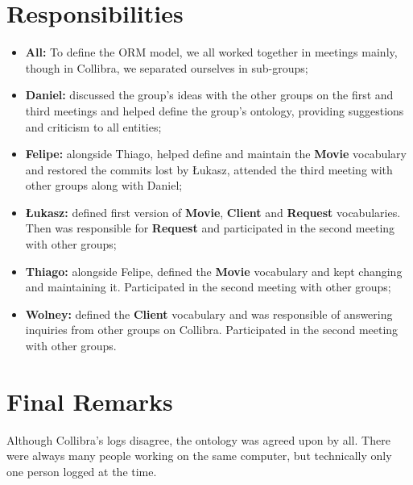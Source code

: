\documentclass[a4paper,10pt]{article}
\begin{document}
\section{Responsibilities}
\begin{itemize}
  \item \textbf{All:} To define the ORM model, we all worked together in meetings mainly, though in Collibra, we separated ourselves in sub-groups;
  \item \textbf{Daniel:} discussed the group's ideas with the other groups on the first and third meetings and helped define the group's ontology, providing suggestions and criticism to all entities;
  \item \textbf{Felipe:} alongside Thiago, helped define and maintain the \textbf{Movie} vocabulary and restored the commits lost by \L{}ukasz, attended the third meeting with other groups along with Daniel;
  \item \textbf{\L{}ukasz:} defined first version of \textbf{Movie}, \textbf{Client} and \textbf{Request} vocabularies. Then was responsible for \textbf{Request} and participated in the second meeting with other groups;
  \item \textbf{Thiago:} alongside Felipe, defined the \textbf{Movie} vocabulary and kept changing and maintaining it. Participated in the second meeting with other groups;
  \item \textbf{Wolney:} defined the \textbf{Client} vocabulary and was responsible of answering inquiries from other groups on Collibra. Participated in the second meeting with other groups.
\end{itemize}

\section{Final Remarks}
Although Collibra's logs disagree, the ontology was agreed upon by all. There were always many people working on the same computer, but technically only one person logged at the time.
\end{document}
